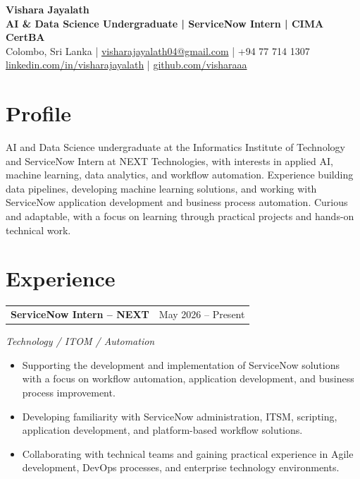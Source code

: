 \documentclass[10pt,a4paper]{article}
\makeatletter
\newcommand{\entry}[2]{
  \vspace{2pt}
  \begin{tabular*}{\textwidth}{@{}l@{\extracolsep{\fill}}r@{}}
    \textbf{#1} & #2 \\
  \end{tabular*}
}
\newcommand{\subentry}[1]{
  \textit{#1}\vspace{-1pt}
}
\makeatother
\begin{document}

\begin{center}
    {\LARGE \textbf{Vishara Jayalath}} \\[3pt]

    \textbf{AI \& Data Science Undergraduate \;|\; ServiceNow Intern \;|\; CIMA CertBA} \\[3pt]

    Colombo, Sri Lanka
    \quad | \quad
    \href{mailto:visharajayalath04@gmail.com}{visharajayalath04@gmail.com}
    \quad | \quad
    +94 77 714 1307 \\[2pt]

    \href{https://www.linkedin.com/in/visharajayalath}
    {linkedin.com/in/visharajayalath}
    \quad | \quad
    \href{https://github.com/visharaaa}
    {github.com/visharaaa}
\end{center}

\vspace{-5pt}


\section*{Profile}

AI and Data Science undergraduate at the Informatics Institute of Technology and ServiceNow Intern at NEXT Technologies, with interests in applied AI, machine learning, data analytics, and workflow automation. Experience building data pipelines, developing machine learning solutions, and working with ServiceNow application development and business process automation. Curious and adaptable, with a focus on learning through practical projects and hands-on technical work.


\section*{Experience}

\entry{ServiceNow Intern -- NEXT}{May 2026 -- Present}
\subentry{Technology / ITOM / Automation}
\begin{itemize}
    \item Supporting the development and implementation of ServiceNow solutions with a focus on workflow automation, application development, and business process improvement.
    \item Developing familiarity with ServiceNow administration, ITSM, scripting, application development, and platform-based workflow solutions.
    \item Collaborating with technical teams and gaining practical experience in Agile development, DevOps processes, and enterprise technology environments.
\end{itemize}
\end{document}
